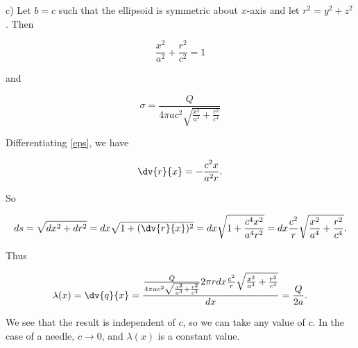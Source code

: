 \documentclass[a4paper,12pt]{report}
\begin{document}
\begin{example_template}
		c) Let \(b = c\) such that the ellipsoid is symmetric about \(x\)-axis and let \(r^2 = y^2 + z^2\). Then
		
		\begin{equation}
			\frac{x^2}{a^2} + \frac{r^2}{c^2} = 1 \label{eps} 
		\end{equation}
		
		and 
		
		\begin{equation}
			\sigma = \frac{Q}{4\pi ac^2\sqrt{\frac{x^2}{a^4} + \frac{r^2}{c^4} } } 
		\end{equation}
		
		Differentiating \cref{eps}, we have 
		
		\begin{equation}
			\dv{r}{x} = -\frac{c^2x}{a^2r}.
		\end{equation}
		
		So
		
		\begin{equation}
			ds = \sqrt{dx^2+dr^2} = dx \sqrt{1+(\dv{r}{x} )^2} = dx \sqrt{1+\frac{c^4x^2}{a^4r^2} } = dx \frac{c^2}{r} \sqrt{\frac{x^2}{a^4} + \frac{r^2}{c^4} } . 
		\end{equation}
		
		Thus
		
		\begin{equation}
			\lambda (x) = \dv{q}{x} = \frac{\frac{Q}{4\pi ac^2\sqrt{\frac{x^2}{a^4} + \frac{r^2}{c^4} } } 2\pi r dx \frac{c^2}{r} \sqrt{\frac{x^2}{a^4} + \frac{r^2}{c^4} } 
			}{dx} = \frac{Q}{2a} .
		\end{equation}
		
		We see that the result is independent of \(c\), so we can take any value of \(c\). In the case of a needle, \(c \rightarrow  0\), and \(\lambda (x)\) is a constant value.
		
		
		
		
		
		
		
		
		
		
		
	\end{example_template}
	
	
	
	
	
	
	
	
	
	
	
	
	
	
	
	
	
	
	
\end{document}
